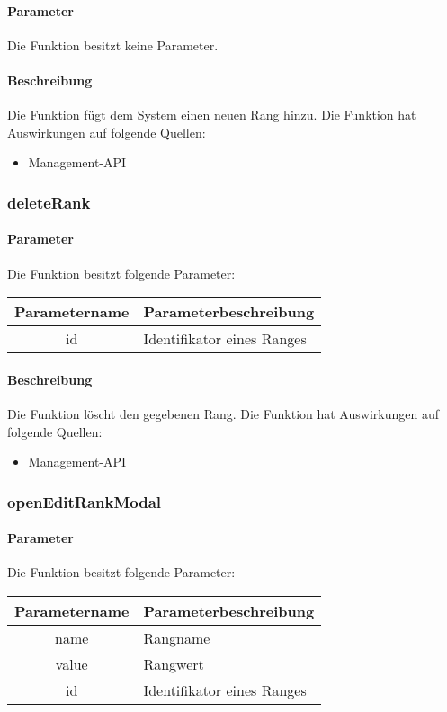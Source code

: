 \paragraph{Parameter} Die Funktion besitzt keine Parameter.
\paragraph{Beschreibung} Die Funktion fügt dem System einen neuen Rang hinzu. Die Funktion hat Auswirkungen auf folgende Quellen:
\begin{itemize}
	\item Management-API
\end{itemize}
\subsubsection{deleteRank}
\paragraph{Parameter} Die Funktion besitzt folgende Parameter:
\begin{table}[H]
	\begin{tabular}{|c|p{11cm}|}
		\hline
		\textbf{Parametername} & \textbf{Parameterbeschreibung} \\ \hline
		id & Identifikator eines Ranges \\ \hline
	\end{tabular}
\end{table}
\paragraph{Beschreibung} Die Funktion löscht den gegebenen Rang. Die Funktion hat Auswirkungen auf folgende Quellen:
\begin{itemize}
	\item Management-API
\end{itemize}
\subsubsection{openEditRankModal}
\paragraph{Parameter} Die Funktion besitzt folgende Parameter:
\begin{table}[H]
	\begin{tabular}{|c|p{11cm}|}
		\hline
		\textbf{Parametername} & \textbf{Parameterbeschreibung} \\ \hline
		name  & Rangname \\ \hline
		value & Rangwert \\ \hline
		id    & Identifikator eines Ranges \\ \hline
	\end{tabular}
\end{table}
